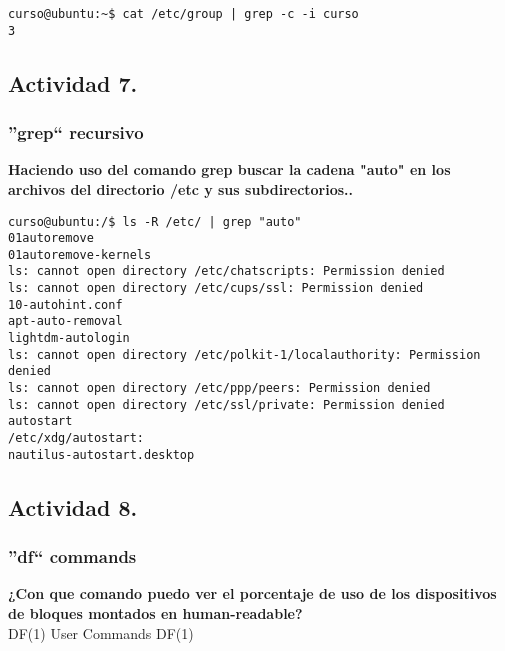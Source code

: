 \documentclass[a4paper,11pt,spanish]{article} %
\newenvironment{myscriptlisting}
{\begin{list}{}{\setlength{\leftmargin}{1em}}\item\scriptsize\bfseries}
{\end{list}}
\begin{document}
\begin{myscriptlisting}
 \begin{verbatim}
curso@ubuntu:~$ cat /etc/group | grep -c -i curso
3
 \end{verbatim}
\end{myscriptlisting}

\subsection{Actividad 7.}

\subsubsection{''grep`` recursivo}

\textbf{Haciendo uso del comando grep buscar la 
cadena "auto" en los archivos del directorio /etc y sus subdirectorios..}

\begin{myscriptlisting}
 \begin{verbatim}
curso@ubuntu:/$ ls -R /etc/ | grep "auto"
01autoremove
01autoremove-kernels
ls: cannot open directory /etc/chatscripts: Permission denied
ls: cannot open directory /etc/cups/ssl: Permission denied
10-autohint.conf
apt-auto-removal
lightdm-autologin
ls: cannot open directory /etc/polkit-1/localauthority: Permission denied
ls: cannot open directory /etc/ppp/peers: Permission denied
ls: cannot open directory /etc/ssl/private: Permission denied
autostart
/etc/xdg/autostart:
nautilus-autostart.desktop
 \end{verbatim}
\end{myscriptlisting}

\subsection{Actividad 8.}

\subsubsection{''df`` commands}

\textbf{¿Con que comando puedo ver el porcentaje de uso de los 
dispositivos de bloques montados en human-readable?}\\

DF(1)                                                                   User Commands                                                                  DF(1)
\end{document}
